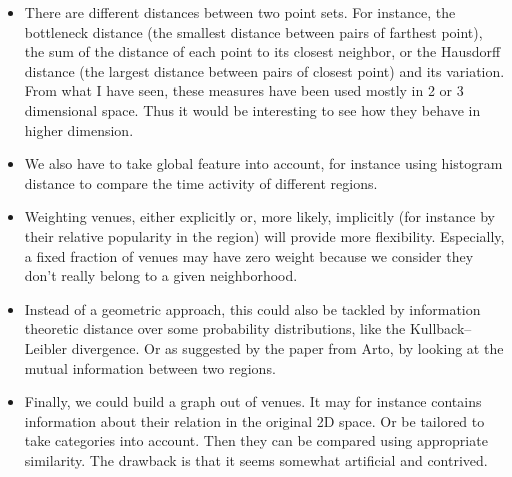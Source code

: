 \documentclass[a4paper,11pt,draft]{scrartcl}
\newcommand{\autocite}[1]{}
\begin{document}
\begin{itemize}
    \item There are different distances between two point sets. For instance,
        the bottleneck distance\autocite{Bottleneck96} (the smallest distance
        between pairs of farthest point), the sum of the distance of each
        point to its closest neighbor, or the Hausdorff distance (the largest
        distance between pairs of closest point) and its
        variation\autocite{ModifiedHausdorff94}. From what I have seen, these
        measures have been used mostly in 2 or 3 dimensional space.  Thus it
        would be interesting to see how they behave in higher dimension.
    \item We also have to take global feature into account, for instance using
        histogram distance\autocite{HistogramDistance02} to compare the time
        activity of different regions.
    \item Weighting venues, either explicitly or, more likely, implicitly (for
        instance by their relative popularity in the region) will provide more
        flexibility. Especially, a fixed fraction of venues may have zero weight
        because we consider they don't really belong to a given neighborhood.
    \item Instead of a geometric approach, this could also be tackled by
        information theoretic distance over some probability distributions,
	like the Kullback--Leibler divergence. Or as suggested by the paper
	from Arto\autocite{InfoMatching10}, by looking at the mutual
	information between two regions.
    \item Finally, we could build a graph out of venues. It may for instance
        contains information about their relation in the original 2D space. Or
        be tailored to take categories into account\autocite{fitting09}. Then
        they can be compared using appropriate
        similarity\autocite{GraphSimilarity14}. The drawback is that it seems
        somewhat artificial and contrived.
\end{itemize}
\end{document}
